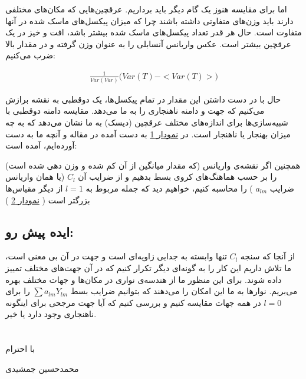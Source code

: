 \documentclass[12pt]{article}
\begin{document}
اما برای مقایسه هنوز یک گام دیگر باید برداریم.
عرقچین‌هایی که مکان‌های مختلفی دارند باید وزن‌های متفاوتی داشته باشند
چرا که میزان پیکسل‌های ماسک شده در آنها متفاوت است.
حال هر قدر تعداد پیکسل‌های ماسک شده بیشتر باشد، افت و خیز در یک عرقچین بیشتر است.
عکس واریانس آنسابلی را به عنوان وزن گرفته و در مقدار بالا ضرب می‌کنیم:

\begin{align}
    \nonumber
    \frac{1}{Var(Var)} \big(Var(T) - <Var(T)>\big)
\end{align}

حال با در دست داشتن این مقدار در تمام پیکسل‌ها، 
یک دوقطبی به نقشه برازش می‌کنیم که جهت و دامنه ناهنجاری را به ما می‌دهد.
مقایسه دامنه دوقطبی 
با شبیه‌سازی‌ها برای اندازه‌های مختلف عرقچین
(دیسک)
به ما نشان می‌دهد که
به چه میزان بهنجار یا ناهنجار است. در
\hyperref[plt_01]{نمودار 1}
به دست آمده در مقاله و آنچه ما به دست آورده‌ایم، آمده است:

همچنین اگر نقشه‌ی واریانس 
(که مقدار میانگین از آن کم شده و وزن دهی شده است)
را بر حسب هماهنگ‌های کروی بسط بدهیم و از ضرایب آن 
$C_l$
(یا همان واریانس ضرایب 
$a_{lm}$
)
را محاسبه کنیم، خواهیم دید که جمله مربوط به 
$l=1$
از دیگر مقیاس‌ها بزرگتر است
(
\hyperref[plt_02]{نمودار 2}
)

\subsection*{ایده پیش رو:}

از آنجا که سنجه 
$C_l$
تنها وابسته به جدایی زاویه‌ای است و جهت در آن بی معنی است،
ما تلاش داریم این کار را به گونه‌ای دیگر تکرار کنیم که در آن جهت‌های مختلف تمییز داده شوند.
برای این منظور ما از هندسه‌ی نواری در مکان‌ها و جهات مختلف بهره می‌بریم.
نوارها به ما این امکان را می‌دهند که بتوانیم ضرایب بسط 
$\sum a_{lm} Y_{lm}$
را برای 
$l=0$
در همه جهات مقایسه کنیم و بررسی کنیم که آیا جهت مرجحی برای اینگونه ناهنجاری وجود دارد یا خیر.
\\
\\
\\

\noindent
با احترام

\noindent
محمدحسین جمشیدی

\newpage
\end{document}
